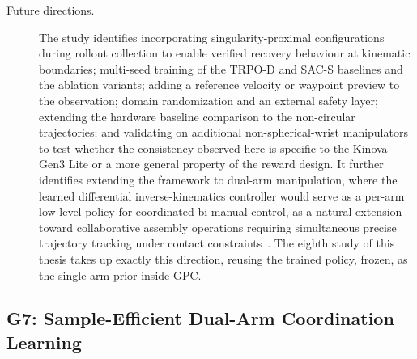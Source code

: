 \begin{description}
    \item[Future directions.] The study identifies incorporating singularity-proximal configurations
    during rollout collection to enable verified recovery behaviour at kinematic boundaries;
    multi-seed training of the TRPO-D and SAC-S baselines and the ablation variants; adding a reference
    velocity or waypoint preview to the observation; domain randomization and an external safety
    layer; extending the hardware baseline comparison to the non-circular
    trajectories; and validating on additional non-spherical-wrist manipulators to test whether the
    consistency observed here is specific to the Kinova Gen3 Lite or a more general property of the
    reward design. It further identifies extending the framework to dual-arm manipulation, where the
    learned differential inverse-kinematics controller would serve as a per-arm low-level policy for
    coordinated bi-manual control, as a natural extension toward collaborative assembly operations
    requiring simultaneous precise trajectory tracking under contact
    constraints~\citep{sk2025diktracking}. The eighth study of this thesis takes up exactly this
    direction, reusing the trained policy, frozen, as the single-arm prior inside GPC.
\end{description}

\subsection{G7: Sample-Efficient Dual-Arm Coordination Learning}\label{sec:concl_g7}

